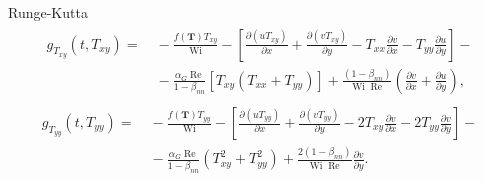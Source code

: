 \begin{frame}{Runge-Kutta}
\begin{gather}
    \begin{aligned}
        g_{T_{xy}}\left(t, T_{xy}\right) = &~- \frac{f(\mathbf{T})T_{xy}}{\operatorname{Wi}} - \left[\frac{\partial (uT_{xy})} {\partial x} + \frac{\partial (vT_{xy})}{\partial y} - T_{xx}\frac{\partial v}{\partial x} - T_{yy}\frac{\partial u}{\partial y}\right] - \\ &~- \frac{\alpha_{G}\operatorname{Re}}{1-\beta_{nn}}\left[T_{xy}\left(T_{xx} + T_{yy}\right)\right] + \frac{(1-\beta_{nn})}{\operatorname{Wi}\operatorname{Re}}\left(\frac{\partial v}{\partial x} + \frac{\partial u}{\partial y}\right),\label{eq_gies_txy_steps_rk}
    \end{aligned}
\end{gather}
\begin{gather}
    \begin{aligned}
        g_{T_{yy}}\left(t, T_{yy}\right) =  &~- \frac{f(\mathbf{T})T_{yy}}{\operatorname{Wi}} - \left[\frac{\partial (uT_{yy})}{\partial x} + \frac{\partial (vT_{yy})}{\partial y} - 2T_{xy}\frac{\partial v}{\partial x} - 2T_{yy}\frac{\partial v}{\partial y}\right] - \\ &~-\frac{\alpha_{G}\operatorname{Re}}{1-\beta_{nn}}\left(T_{xy}^{2} + T_{yy}^{2}\right) + \frac{2(1-\beta_{nn})}{\operatorname{Wi}\operatorname{Re}}\frac{\partial v}{\partial y}.\label{eq_gies_tyy_steps_rk}
    \end{aligned}
\end{gather}
\end{frame}

